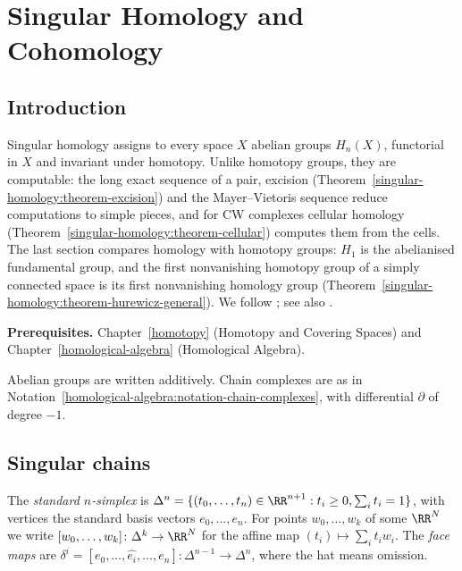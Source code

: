 \chapter{Singular Homology and Cohomology}\label{singular-homology}

\section{Introduction}\label{singular-homology:section-introduction}

Singular homology assigns to every space $X$ abelian groups $H_n(X)$, functorial in $X$ and invariant under homotopy. Unlike
homotopy groups, they are computable: the long exact sequence of a pair, excision
(Theorem~\ref{singular-homology:theorem-excision}) and the Mayer--Vietoris sequence reduce computations to simple pieces, and for CW
complexes cellular homology (Theorem~\ref{singular-homology:theorem-cellular}) computes them from the cells. The last section compares homology with homotopy
groups: $H_1$ is the abelianised fundamental group, and the first nonvanishing homotopy group of a simply connected space is its first nonvanishing homology group
(Theorem~\ref{singular-homology:theorem-hurewicz-general}). We follow
\cite[Chapter 2]{hatcher-at}; see also \cite{spanier-at}.

\noindent\textbf{Prerequisites.} Chapter~\ref{homotopy} (Homotopy and Covering Spaces) and Chapter~\ref{homological-algebra}
(Homological Algebra).

Abelian groups are written additively. Chain complexes are as in Notation~\ref{homological-algebra:notation-chain-complexes}, with
differential $\partial$ of degree $-1$.

\section{Singular chains}\label{singular-homology:section-chains}

\begin{definition}\label{singular-homology:definition-simplex}
The \emph{standard $n$-simplex} is $\Delta^n = \{(t_0, \ldots, t_n) \in \RR^{n+1} : t_i \geq 0, \sum_i t_i = 1\}$, with vertices the standard basis
vectors $e_0, \ldots, e_n$. For points $w_0, \ldots, w_k$ of some $\RR^N$ we write $[w_0, \ldots, w_k] \colon \Delta^k \to \RR^N$ for the affine map
$(t_i) \mapsto \sum_i t_iw_i$. The \emph{face maps} are $\delta^i = [e_0, \ldots, \widehat{e_i}, \ldots, e_n] \colon \Delta^{n-1} \to \Delta^n$, where the hat
means omission.
\end{definition}

